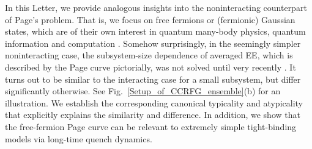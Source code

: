 \documentclass[twocolumn,english,prl,aps,superscriptaddress,amsmath,amssymb,floatfix]{revtex4-2}
\begin{document}

In this Letter, we provide analogous insights into
the noninteracting counterpart of Page's problem.  %
That is, we focus on free fermions or (fermionic) Gaussian states, which are of their own interest in quantum many-body physics, quantum information and computation \citep{matchgates,PhysRevA.65.032325,Bravyi2005,Wolf2006,Banuls2007,Fidkowski2010,PhysRevLett.116.030401,Shi2018,PhysRevLett.120.190501,PhysRevLett.121.200501,Circuit_complexity_free_fermion,fermionicTomograph1,Oszmaniec2022,Matos2022}. Somehow surprisingly, in the seemingly simpler noninteracting
case, the subsystem-size dependence of averaged EE,
which is described by the Page curve pictorially, was not solved until
very recently \citep{Bianchi2021,Bianchi2021a}. It turns out to be similar to the interacting case for a small subsystem, but differ significantly otherwise. See Fig.~\ref{Setup_of_CCRFG_ensemble}(b) for an illustration. We establish the corresponding %
canonical typicality and atypicality that explicitly explains the similarity and difference. In addition, we show that the free-fermion Page curve can be relevant to extremely simple tight-binding models via long-time quench dynamics. %
\end{document}
